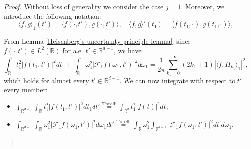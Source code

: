 \documentclass[corpo=11pt, stile=classica, tipotesi=custom,
greek, evenboxes, english]{toptesi}
\numberwithin{equation}{chapter}
\theoremstyle{definition}
\theoremstyle{remark}
\newcommand{\R}{\mathbb{R}} %
\newcommand{\F}{\mathscr{F}} %
\begin{document}
\begin{proof}
	Without loss of generality we consider the case $j=1$. Moreover, we introduce the following notation:
	\begin{equation*}
		\langle f, g \rangle_1(t') = \langle f(\cdot, t'), g(\cdot,t') \rangle, \quad \langle f, g \rangle'(t_1) = \langle f(t_1, \cdot), g(t_1, \cdot) \rangle,
	\end{equation*}
	
	From Lemma \ref{Heisenberg's uncertainty principle lemma}, since $f (\cdot, t') \in L^2(\R)$ for a.e. $t' \in \R^{d-1}$, we have:
	\begin{equation*}
		\int_{\R} t_1^2 |f(t_1, t')|^2 dt_1 + \int_{\R} \omega_1^2 |\F_1 f(\omega_1, t')|^2 d\omega_1 = \dfrac{1}{2\pi} \sum_{k_1=0}^{+\infty} (2k_1 + 1) |\langle f, H_{k_1} \rangle_1|^2,
	\end{equation*}
	which holds for almost every $t' \in \R^{d-1}$. We can now integrate with respect to $t'$ every member:
	\begin{itemize}
		\item $\displaystyle \int_{\R^{d-1}} \int_{\R} t_1^2 |f(t_1, t')|^2 dt_1 dt' \overset{\mathrm{Tonelli}}{=} \int_{\R^d} t_1^2 |f(t)|^2 dt$;
		\item $\displaystyle \int_{\R^{d-1}} \int_{\R}  \omega_1^2|\F_1 f(\omega_1, t')|^2 d\omega_1 dt' \overset{\mathrm{Tonelli}}{=} \int_{\R} \omega_1^2 \int_{\R^{d-1}} |\F_1 f(\omega_1, t')|^2 dt' d\omega_1$.\vspace{0.1mm}\\
		

\end{itemize}
\end{proof}
\end{document}
